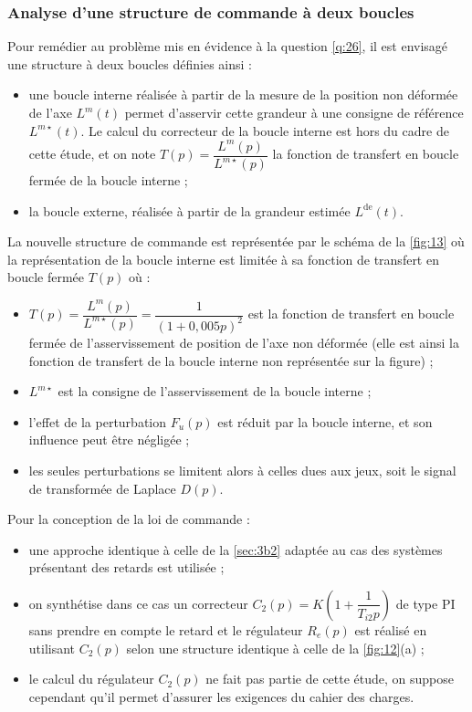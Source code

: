 \subsubsection{Analyse d’une structure de commande à deux boucles}
Pour remédier au problème mis en évidence à la question \ref{q:26}, il est envisagé une structure à deux boucles définies
ainsi :
\begin{itemize}
\item une boucle interne réalisée à partir de la mesure de la position non déformée de l’axe $L^m(t)$ permet d’asservir
cette grandeur à une consigne de référence $L^{m\star}(t)$. Le calcul du correcteur de la boucle interne est hors du
cadre de cette étude, et on note $T(p)=\dfrac{L^{m}(p)}{L^{m\star}(p)}$ la fonction de transfert en boucle fermée de la boucle interne ;
\item la boucle externe, réalisée à partir de la grandeur estimée $L^{\text{de}}(t)$.
\end{itemize}
La nouvelle structure de commande est représentée par le schéma de la \autoref{fig:13} où la représentation de la
boucle interne est limitée à sa fonction de transfert en boucle fermée $T(p)$ où :
\begin{itemize}
\item $T(p)=\dfrac{L^{m}(p)}{L^{m\star}(p)}=\dfrac{1}{(1+0,005p)^2}$
est la fonction de transfert en boucle fermée de l’asservissement
de position de l’axe non déformée (elle est ainsi la fonction de transfert de la boucle interne non représentée
sur la figure) ;
\item $L^{m\star}$ est la consigne de l’asservissement de la boucle interne ;
\item l’effet de la perturbation $F_u(p)$ est réduit par la boucle interne, et son influence peut être négligée ;
\item les seules perturbations se limitent alors à celles dues aux jeux, soit le signal de transformée de Laplace $D(p)$.
\end{itemize}
Pour la conception de la loi de commande :
\begin{itemize}
\item une approche identique à celle de la \autoref{sec:3b2} adaptée au cas des systèmes présentant des retards est
utilisée ;
\item on synthétise dans ce cas un correcteur $C_2(p)=K\left(1+\dfrac{1}{T_{i2} p}\right)$ de type PI sans prendre en compte le retard
et le régulateur $R_e(p)$ est réalisé en utilisant $C_2(p)$ selon une structure identique à celle de la \autoref{fig:12}(a) ;
\item le calcul du régulateur $C_2(p)$ ne fait pas partie de cette étude, on suppose cependant qu’il permet d’assurer
les exigences du cahier des charges.
\end{itemize}


